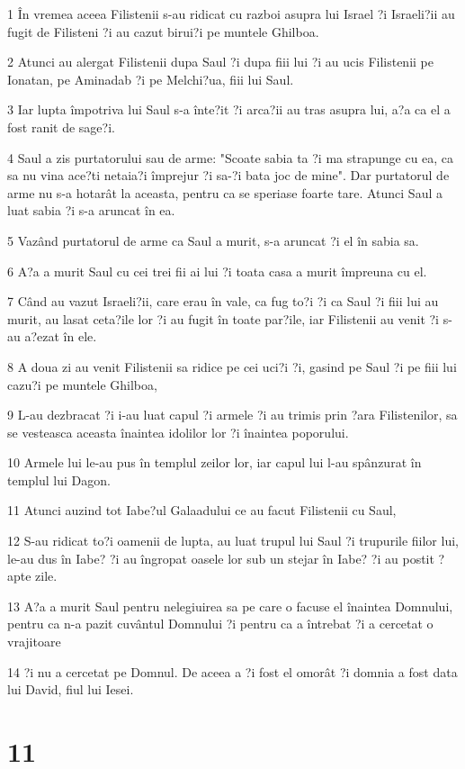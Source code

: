\par 1 În vremea aceea Filistenii s-au ridicat cu razboi asupra lui Israel ?i Israeli?ii au fugit de Filisteni ?i au cazut birui?i pe muntele Ghilboa.
\par 2 Atunci au alergat Filistenii dupa Saul ?i dupa fiii lui ?i au ucis Filistenii pe Ionatan, pe Aminadab ?i pe Melchi?ua, fiii lui Saul.
\par 3 Iar lupta împotriva lui Saul s-a înte?it ?i arca?ii au tras asupra lui, a?a ca el a fost ranit de sage?i.
\par 4 Saul a zis purtatorului sau de arme: "Scoate sabia ta ?i ma strapunge cu ea, ca sa nu vina ace?ti netaia?i împrejur ?i sa-?i bata joc de mine". Dar purtatorul de arme nu s-a hotarât la aceasta, pentru ca se speriase foarte tare. Atunci Saul a luat sabia ?i s-a aruncat în ea.
\par 5 Vazând purtatorul de arme ca Saul a murit, s-a aruncat ?i el în sabia sa.
\par 6 A?a a murit Saul cu cei trei fii ai lui ?i toata casa a murit împreuna cu el.
\par 7 Când au vazut Israeli?ii, care erau în vale, ca fug to?i ?i ca Saul ?i fiii lui au murit, au lasat ceta?ile lor ?i au fugit în toate par?ile, iar Filistenii au venit ?i s-au a?ezat în ele.
\par 8 A doua zi au venit Filistenii sa ridice pe cei uci?i ?i, gasind pe Saul ?i pe fiii lui cazu?i pe muntele Ghilboa,
\par 9 L-au dezbracat ?i i-au luat capul ?i armele ?i au trimis prin ?ara Filistenilor, sa se vesteasca aceasta înaintea idolilor lor ?i înaintea poporului.
\par 10 Armele lui le-au pus în templul zeilor lor, iar capul lui l-au spânzurat în templul lui Dagon.
\par 11 Atunci auzind tot Iabe?ul Galaadului ce au facut Filistenii cu Saul,
\par 12 S-au ridicat to?i oamenii de lupta, au luat trupul lui Saul ?i trupurile fiilor lui, le-au dus în Iabe? ?i au îngropat oasele lor sub un stejar în Iabe? ?i au postit ?apte zile.
\par 13 A?a a murit Saul pentru nelegiuirea sa pe care o facuse el înaintea Domnului, pentru ca n-a pazit cuvântul Domnului ?i pentru ca a întrebat ?i a cercetat o vrajitoare
\par 14 ?i nu a cercetat pe Domnul. De aceea a ?i fost el omorât ?i domnia a fost data lui David, fiul lui Iesei.

\chapter{11}

